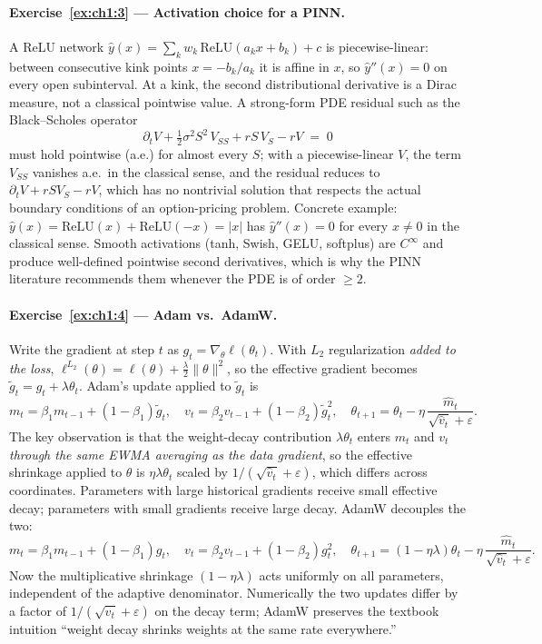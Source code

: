 \documentclass[11pt,a4paper]{report}
\begin{document}
\paragraph{Exercise~\ref{ex:ch1:3} --- Activation choice for a PINN.}
A ReLU network $\hat y(x) = \sum_k w_k\,\mathrm{ReLU}(a_k x + b_k) + c$ is piecewise-linear: between consecutive kink points $x = -b_k/a_k$ it is affine in $x$, so $\hat y''(x) = 0$ on every open subinterval.  At a kink, the second distributional derivative is a Dirac measure, not a classical pointwise value.  A strong-form PDE residual such as the Black--Scholes operator
\[
\partial_t V + \tfrac{1}{2}\sigma^2 S^2\,V_{SS} + r S\,V_S - r V \;=\; 0
\]
must hold pointwise (a.e.) for almost every $S$; with a piecewise-linear $V$, the term $V_{SS}$ vanishes a.e.\ in the classical sense, and the residual reduces to $\partial_t V + r S V_S - rV$, which has no nontrivial solution that respects the actual boundary conditions of an option-pricing problem.  Concrete example: $\hat y(x) = \mathrm{ReLU}(x) + \mathrm{ReLU}(-x) = |x|$ has $\hat y''(x) = 0$ for every $x \neq 0$ in the classical sense.  Smooth activations (tanh, Swish, GELU, softplus) are $C^\infty$ and produce well-defined pointwise second derivatives, which is why the PINN literature recommends them whenever the PDE is of order $\ge 2$.

\paragraph{Exercise~\ref{ex:ch1:4} --- Adam vs.\ AdamW.}
Write the gradient at step $t$ as $g_t = \nabla_\theta \ell(\theta_t)$.  With $L_2$ regularization \emph{added to the loss}, $\ell^{L_2}(\theta) = \ell(\theta) + \tfrac{\lambda}{2}\|\theta\|^2$, so the effective gradient becomes $\tilde g_t = g_t + \lambda \theta_t$.  Adam's update applied to $\tilde g_t$ is
\[
m_t = \beta_1 m_{t-1} + (1-\beta_1)\tilde g_t,\quad v_t = \beta_2 v_{t-1} + (1-\beta_2)\tilde g_t^2,\quad
\theta_{t+1} = \theta_t - \eta\,\frac{\hat m_t}{\sqrt{\hat v_t} + \varepsilon}.
\]
The key observation is that the weight-decay contribution $\lambda \theta_t$ enters $m_t$ and $v_t$ \emph{through the same EWMA averaging as the data gradient}, so the effective shrinkage applied to $\theta$ is $\eta\lambda \theta_t$ scaled by $1/(\sqrt{\hat v_t}+\varepsilon)$, which differs across coordinates.  Parameters with large historical gradients receive small effective decay; parameters with small gradients receive large decay.  AdamW decouples the two:
\[
m_t = \beta_1 m_{t-1} + (1-\beta_1) g_t,\quad v_t = \beta_2 v_{t-1} + (1-\beta_2) g_t^2,\quad
\theta_{t+1} = (1 - \eta\lambda)\theta_t - \eta\,\frac{\hat m_t}{\sqrt{\hat v_t}+\varepsilon}.
\]
Now the multiplicative shrinkage $(1 - \eta\lambda)$ acts uniformly on all parameters, independent of the adaptive denominator.  Numerically the two updates differ by a factor of $1/(\sqrt{\hat v_t}+\varepsilon)$ on the decay term; AdamW preserves the textbook intuition ``weight decay shrinks weights at the same rate everywhere.''
\end{document}
